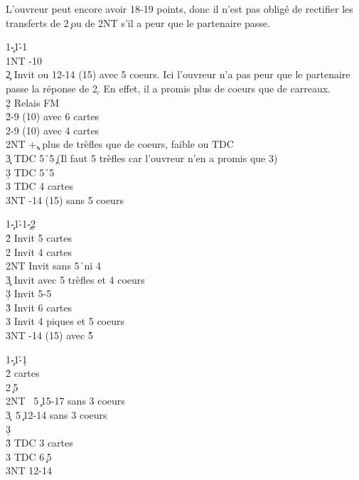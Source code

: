 \documentclass[a4paper]{article}
\begin{document}
L'ouvreur peut encore avoir 18-19 points, donc il n'est pas obligé de rectifier
les transferts de 2\c\ ou de 2NT s'il a peur que le partenaire passe.

\begin{bidtable}
1\c-1\h-1\s\+\\
1NT -10\\
2\c \> Invit ou 12-14 (15) avec 5 coeurs. Ici l'ouvreur n'a pas peur que le partenaire\\
\>passe la réponse de 2\d . En effet, il a promis plus de coeurs que de carreaux.\\
2\d \> Relais FM\\
2\h {}-9 (10) avec 6 cartes\\
2\s {}-9 (10) avec 4 cartes\\
2NT +\c , plus de trèfles que de coeurs, faible ou TDC\\
3\c \> TDC 5\h\ 5\c\ (Il faut 5 trèfles car l'ouvreur n'en a promis que 3)\\
3\d \> TDC 5\h\ 5\d \\
3\s \> TDC 4 cartes\\
3NT -14 (15) sans 5 coeurs\-
\end{bidtable}

\begin{bidtable}
1\c-1\h-1\c-2\d\+\\
2\h \> Invit 5 cartes\\
2\s \> Invit 4 cartes\\
2NT \> Invit sans 5\h\ ni 4\s \\
3\c \> Invit avec 5 trèfles et 4 coeurs\\
3\d \> Invit 5-5\\
3\h \> Invit 6 cartes\\
3\s \> Invit 4 piques et 5 coeurs\\
3NT -14 (15) avec 5\h \-
\end{bidtable}

\begin{bidtable}
1\c-1\h-1\d\+\\
2\h {} cartes\\
2\s {}\c\ 5\s \\
2NT \s\ 5\c\ 15-17 sans 3 coeurs\\
3\c {}\s\ 5\c\ 12-14 sans 3 coeurs\\
3\d {}\\
3\h \> TDC 3 cartes\\
3\s \> TDC 6\c\ 5\s \\
3NT  12-14\-
\end{bidtable}
\end{document}
